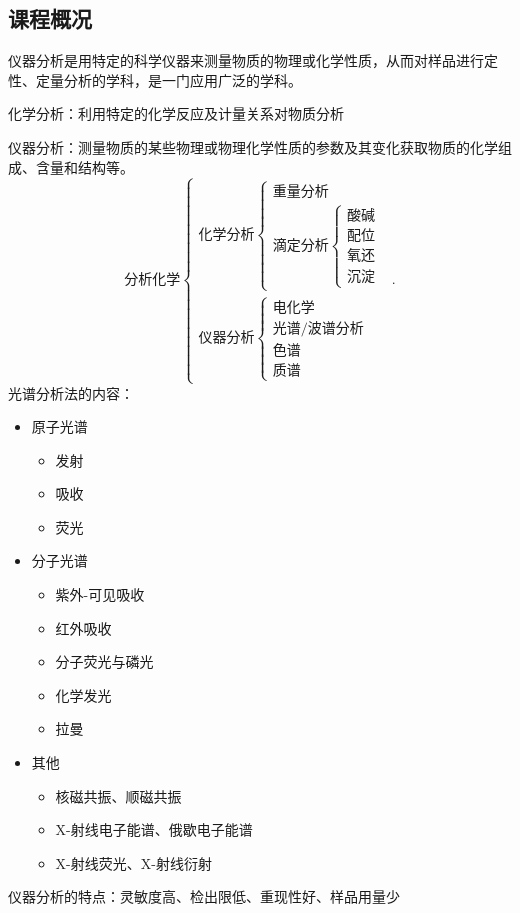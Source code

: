 \subsection{课程概况}%
\label{sub:课程概况}
仪器分析是用特定的科学仪器来测量物质的物理或化学性质，从而对样品进行定性、定量分析的学科，是一门应用广泛的学科。
\begin{notation}
化学分析：利用特定的化学反应及计量关系对物质分析
\end{notation}
仪器分析：测量物质的某些物理或物理化学性质的参数及其变化获取物质的化学组成、含量和结构等。
\[
    \text{分析化学}\begin{cases}
        \text{化学分析}\begin{cases}
            \text{重量分析}\\
            \text{滴定分析}\begin{cases}
                \text{酸碱}\\
                \text{配位}\\
                \text{氧还}\\
                \text{沉淀}
            \end{cases}
        \end{cases}\\
        \text{仪器分析}\begin{cases}
            \text{电化学}\\
            \text{光谱/波谱分析}\\
            \text{色谱}\\
            \text{质谱}
        \end{cases}
    \end{cases}
.\]
光谱分析法的内容：
\begin{itemize}
    \item 原子光谱
        \begin{itemize}
            \item 发射
            \item 吸收
            \item 荧光
            
        \end{itemize}
    \item 分子光谱
        \begin{itemize}
            \item 紫外-可见吸收
            \item 红外吸收
            \item 分子荧光与磷光
            \item 化学发光
            \item 拉曼
            
        \end{itemize}
    \item 其他
        \begin{itemize}
            \item 核磁共振、顺磁共振
            \item X-射线电子能谱、俄歇电子能谱
            \item X-射线荧光、X-射线衍射
            
        \end{itemize}
    
\end{itemize}
仪器分析的特点：灵敏度高、检出限低、重现性好、样品用量少

